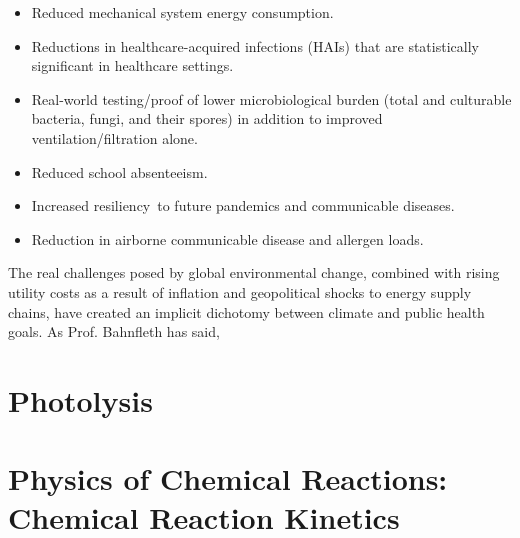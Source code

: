 \begin{itemize}
\item Reduced mechanical system energy consumption.
\item Reductions in healthcare-acquired infections (HAIs) that are statistically significant in healthcare settings.
\item Real-world testing/proof of lower microbiological burden (total and culturable bacteria, fungi, and their spores) in addition to improved ventilation/filtration alone.
\item Reduced school absenteeism.
\item Increased resiliency to future pandemics and communicable diseases.
\item Reduction in airborne communicable disease and allergen loads.
\end{itemize}



The real challenges posed by global environmental change, combined with rising utility costs as a result of inflation and geopolitical shocks to energy supply chains, have created an implicit dichotomy between climate and public health goals. As Prof. Bahnfleth has said,

\section{Photolysis}


\section{Physics of Chemical Reactions: Chemical Reaction Kinetics}


